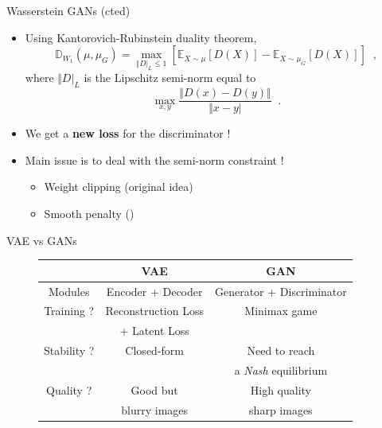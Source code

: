 \documentclass{beamer}
\begin{document}
\begin{frame}{Wasserstein GANs (cted)}
    \begin{itemize}
        \item Using \textcolor{cOrange}{Kantorovich-Rubinstein duality theorem},
        \[ \mathbb{D}_{W_1}(\mu, \mu_G) = \mathop{max}_{\Vert D \vert_L \leq 1} \left[ \mathbb{E}_{X\sim \mu}\left[ D(X) \right] - \mathbb{E}_{X\sim \mu_G}\left[ D(X) \right] \right] \;\;, \]
        where $\Vert D \vert_L$ is the \textcolor{cOrange}{Lipschitz semi-norm} equal to
        \[ \mathop{max}_{x,y} \frac{\Vert D(x)-D(y) \Vert }{\Vert x-y \vert} \;\;. \]
        \item We get a \textcolor{cBlue}{\textbf{new loss}} for the discriminator !
        \item Main issue is to deal with the semi-norm constraint !
        \begin{itemize}
            \item Weight clipping (original idea)
            \item Smooth penalty (\cite{iwgan})
        \end{itemize} 
    \end{itemize}
\end{frame}


\begin{frame}{VAE vs GANs}
    \begin{figure}
        \centering
        \begin{tabular}{|c|c|c|}
                \hline
                \cellcolor{cBlue!20} & \cellcolor{cBlue!20} VAE & \cellcolor{cBlue!20} GAN \\
                \hline
                \hline
                Modules & Encoder + Decoder & Generator + Discriminator \\
                \hline
                Training ? & Reconstruction Loss & Minimax game \\
                & + Latent Loss & \\
                \hline
                Stability ? & \cellcolor{cGreen!50} Closed-form & \cellcolor{cRed!50} Need to reach \\
                & \cellcolor{cGreen!50} & \cellcolor{cRed!50} a \emph{Nash} equilibrium  \\
                \hline
                Quality ? & \cellcolor{cOrange!50} Good but  & \cellcolor{cGreen!50} High quality \\
                & \cellcolor{cOrange!50} blurry images & \cellcolor{cGreen!50} sharp images \\
                \hline
                \hline
        \end{tabular}
    \end{figure}
\end{frame}
\end{document}
